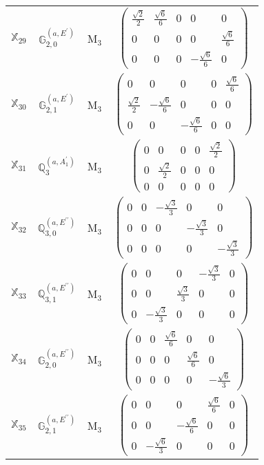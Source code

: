 \documentclass[fleqn,10pt,landscape]{article}
\begin{document}
\begin{itemize}
\begin{center}
\begin{longtable}{c|c|c|c}
$ \mathbb{X}_{29} $ & $\mathbb{G}_{2,0}^{(a,E^{\prime})}$ & M$_{3}$ & $\begin{pmatrix} \frac{\sqrt{2}}{2} & \frac{\sqrt{6}}{6} & 0 & 0 & 0 \\ 0 & 0 & 0 & 0 & \frac{\sqrt{6}}{6} \\ 0 & 0 & 0 & - \frac{\sqrt{6}}{6} & 0 \end{pmatrix}$ \\
$ \mathbb{X}_{30} $ & $\mathbb{G}_{2,1}^{(a,E^{\prime})}$ & M$_{3}$ & $\begin{pmatrix} 0 & 0 & 0 & 0 & \frac{\sqrt{6}}{6} \\ \frac{\sqrt{2}}{2} & - \frac{\sqrt{6}}{6} & 0 & 0 & 0 \\ 0 & 0 & - \frac{\sqrt{6}}{6} & 0 & 0 \end{pmatrix}$ \\
$ \mathbb{X}_{31} $ & $\mathbb{Q}_{3}^{(a,A_{1}^{\prime})}$ & M$_{3}$ & $\begin{pmatrix} 0 & 0 & 0 & 0 & \frac{\sqrt{2}}{2} \\ 0 & \frac{\sqrt{2}}{2} & 0 & 0 & 0 \\ 0 & 0 & 0 & 0 & 0 \end{pmatrix}$ \\
$ \mathbb{X}_{32} $ & $\mathbb{Q}_{3,0}^{(a,E^{\prime\prime})}$ & M$_{3}$ & $\begin{pmatrix} 0 & 0 & - \frac{\sqrt{3}}{3} & 0 & 0 \\ 0 & 0 & 0 & - \frac{\sqrt{3}}{3} & 0 \\ 0 & 0 & 0 & 0 & - \frac{\sqrt{3}}{3} \end{pmatrix}$ \\
$ \mathbb{X}_{33} $ & $\mathbb{Q}_{3,1}^{(a,E^{\prime\prime})}$ & M$_{3}$ & $\begin{pmatrix} 0 & 0 & 0 & - \frac{\sqrt{3}}{3} & 0 \\ 0 & 0 & \frac{\sqrt{3}}{3} & 0 & 0 \\ 0 & - \frac{\sqrt{3}}{3} & 0 & 0 & 0 \end{pmatrix}$ \\
$ \mathbb{X}_{34} $ & $\mathbb{G}_{2,0}^{(a,E^{\prime\prime})}$ & M$_{3}$ & $\begin{pmatrix} 0 & 0 & \frac{\sqrt{6}}{6} & 0 & 0 \\ 0 & 0 & 0 & \frac{\sqrt{6}}{6} & 0 \\ 0 & 0 & 0 & 0 & - \frac{\sqrt{6}}{3} \end{pmatrix}$ \\
$ \mathbb{X}_{35} $ & $\mathbb{G}_{2,1}^{(a,E^{\prime\prime})}$ & M$_{3}$ & $\begin{pmatrix} 0 & 0 & 0 & \frac{\sqrt{6}}{6} & 0 \\ 0 & 0 & - \frac{\sqrt{6}}{6} & 0 & 0 \\ 0 & - \frac{\sqrt{6}}{3} & 0 & 0 & 0 \end{pmatrix}$ \\

\end{longtable}
\end{center}
\end{itemize}
\end{document}
